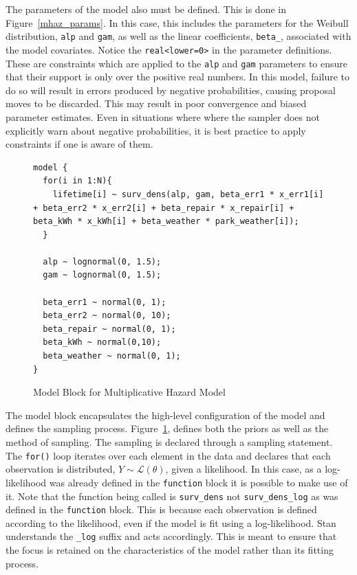 The parameters of the model also must be defined. This is done in Figure~\ref{mhaz_params}. In this case, this includes the parameters for the Weibull distribution, \lstinline{alp} and \lstinline{gam}, as well as the linear coefficients, \lstinline{beta_}, associated with the model covariates. Notice the \lstinline{real<lower=0>} in the parameter definitions. These are constraints which are applied to the \lstinline{alp} and \lstinline{gam} parameters to ensure that their support is only over the positive real numbers. In this model, failure to do so will result in errors produced by negative probabilities, causing proposal moves to be discarded. This may result in poor convergence and biased parameter estimates. Even in situations where where the sampler does not explicitly warn about negative probabilities, it is best practice to apply constraints if one is aware of them.

\begin{figure}[htbp]
    \centering
    \begin{lstlisting}[belowskip=-2 \baselineskip]
model {
  for(i in 1:N){
    lifetime[i] ~ surv_dens(alp, gam, beta_err1 * x_err1[i] + beta_err2 * x_err2[i] + beta_repair * x_repair[i] + beta_kWh * x_kWh[i] + beta_weather * park_weather[i]);
  }

  alp ~ lognormal(0, 1.5);
  gam ~ lognormal(0, 1.5);
  
  beta_err1 ~ normal(0, 1);
  beta_err2 ~ normal(0, 10);
  beta_repair ~ normal(0, 1);
  beta_kWh ~ normal(0,10);
  beta_weather ~ normal(0, 1);
}\end{lstlisting}
    \caption{Model Block for Multiplicative Hazard Model}
    \label{mhaz_model}
\end{figure}


The model block encapsulates the high-level configuration of the model and defines the sampling process. Figure~\ref{mhaz_model}, defines both the priors as well as the method of sampling. The sampling is declared through a sampling statement. The \lstinline{for()} loop iterates over each element in the data and declares that each observation is distributed, $Y \sim \mathcal {L}(\theta)$,  given a likelihood. In this case, as a log-likelihood was already defined in the \lstinline{function} block it is possible to make use of it. Note that the function being called is \lstinline{surv_dens} not \lstinline{surv_dens_log} as was defined in the \lstinline{function} block. This is because each observation is defined according to the likelihood, even if the model is fit using a log-likelihood. Stan understands the \lstinline{_log} suffix and acts accordingly. This is meant to ensure that the focus is retained on the characteristics of the model rather than its fitting process. 

